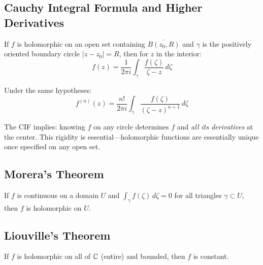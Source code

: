 \subsection{Cauchy Integral Formula and Higher Derivatives}

\begin{theorem}\label{thm:CIF}
If $f$ is holomorphic on an open set containing $\overline{B(z_0, R)}$ and $\gamma$ is the positively oriented boundary circle $|z - z_0| = R$, then for $z$ in the interior:
\begin{equation}
f(z) = \frac{1}{2\pi i} \int_{\gamma} \frac{f(\zeta)}{\zeta - z} \, d\zeta
\end{equation}
\end{theorem}

\begin{corollary}\label{cor:CIF-derivatives}
Under the same hypotheses:
\begin{equation}
f^{(n)}(z) = \frac{n!}{2\pi i} \int_{\gamma} \frac{f(\zeta)}{(\zeta - z)^{n+1}} \, d\zeta
\end{equation}
\end{corollary}

\begin{keyidea}
The CIF implies: knowing $f$ on any circle determines $f$ and \textit{all its derivatives} at the center. This rigidity is essential—holomorphic functions are essentially unique once specified on any open set.
\end{keyidea}

\subsection{Morera's Theorem}

\begin{theorem}[Morera]\label{thm:morera}
If $f$ is continuous on a domain $U$ and $\int_{\gamma} f(\zeta) \, d\zeta = 0$ for all triangles $\gamma \subset U$, then $f$ is holomorphic on $U$.
\end{theorem}

\subsection{Liouville's Theorem}

\begin{theorem}[Liouville]\label{thm:liouville}
If $f$ is holomorphic on all of $\mathbb{C}$ (entire) and bounded, then $f$ is constant.
\end{theorem}

